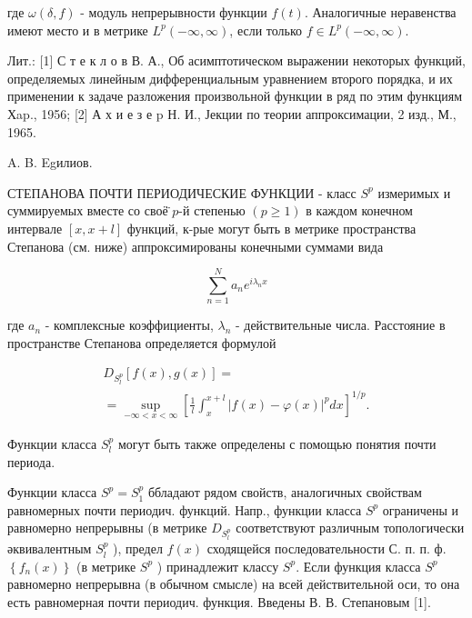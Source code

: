 \documentclass[10pt]{article}
\begin{document}
где $\omega(\delta, f)$ - модуль непрерывности функции $f(t)$. Аналогичные неравенства имеют место и в метрике $L^{p}(-\infty, \infty)$, если только $f \in L^{p}(-\infty, \infty)$.



Лит.: [1] С т е к л о в В. А., Об асимптотическом выражении некоторых функций, определяемых линейным дифференциальным уравнением второго порядка, и их применении к задаче разложения произвольной функции в ряд по этим функциям Хap., 1956; [2] А х и е з е p Н. И., Јекции по теории аппроксимации, 2 изд., М., 1965.



A. B. Egилиов.



СТЕПАНОВА ПОЧТИ ПЕРИОДИЧЕСКИЕ ФУНКЦИИ - класс $S^{p}$ измеримых и суммируемых вместе со своё̈ $p$-й степенью $(p \geqslant 1)$ в каждом конечном интервале $[x, x+l]$ функций, к-рые могут быть в метрике пространства Степанова (см. ниже) аппроксимированы конечными суммами вида



\[

\sum_{n=1}^{N} a_{n} e^{i \lambda_{n} x}

\]



где $a_{n}$ - комплексные коэффициенты, $\lambda_{n}$ - действительные числа. Расстояние в пространстве Степанова определяется формулой



\[

\begin{gathered}

D_{S_{l}^{p}}[f(x), g(x)]= \\

=\sup _{-\infty<x<\infty}\left[\frac{1}{l} \int_{x}^{x+l}|f(x)-\varphi(x)|^{p} d x\right]^{1 / p} .

\end{gathered}

\]



Функции класса $S_{l}^{p}$ могут быть также определены с помощью понятия почти периода.



Функции класса $S^{p}=S_{1}^{p}$ ббладают рядом свойств, аналогичных свойствам равномерных почти периодич. функций. Напр., функции класса $S^{p}$ ограничены и равномерно непрерывны (в метрике $D_{S_{l}^{p}}$ соответствуют различным топологически әквивалентным $S_{l}^{p}$ ), предел $f(x)$ сходящейся последовательности С. п. п. ф. $\left\{f_{n}(x)\right\}$ (в метрике $S^{p}$ ) принадлежит классу $S^{p}$. Если функция класса $S^{p}$ равномерно непрерывна (в обычном смысле) на всей действительной оси, то она есть равномерная почти периодич. функция. Введены В. В. Степановым [1].
\end{document}

